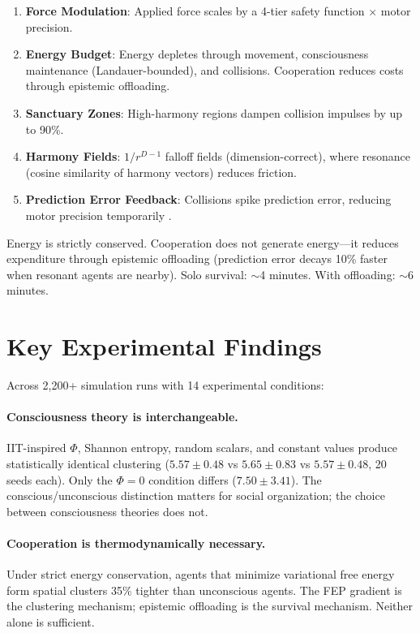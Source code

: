 \documentclass[12pt]{book}
\begin{document}
\begin{enumerate}[nosep]
  \item \textbf{Force Modulation}: Applied force scales by a 4-tier safety function $\times$ motor precision.
  \item \textbf{Energy Budget}: Energy depletes through movement, consciousness maintenance (Landauer-bounded), and collisions. Cooperation reduces costs through epistemic offloading.
  \item \textbf{Sanctuary Zones}: High-harmony regions dampen collision impulses by up to 90\%.
  \item \textbf{Harmony Fields}: $1/r^{D-1}$ falloff fields (dimension-correct), where resonance (cosine similarity of harmony vectors) reduces friction.
  \item \textbf{Prediction Error Feedback}: Collisions spike prediction error, reducing motor precision temporarily \citep{adams2013}.
\end{enumerate}

Energy is strictly conserved. Cooperation does not generate energy---it reduces expenditure through epistemic offloading (prediction error decays 10\% faster when resonant agents are nearby). Solo survival: $\sim$4 minutes. With offloading: $\sim$6 minutes.

\section{Key Experimental Findings}

Across 2,200+ simulation runs with 14 experimental conditions:

\paragraph{Consciousness theory is interchangeable.} IIT-inspired $\Phi$, Shannon entropy, random scalars, and constant values produce statistically identical clustering ($5.57 \pm 0.48$ vs $5.65 \pm 0.83$ vs $5.57 \pm 0.48$, 20 seeds each). Only the $\Phi = 0$ condition differs ($7.50 \pm 3.41$). The conscious/unconscious distinction matters for social organization; the choice between consciousness theories does not.

\paragraph{Cooperation is thermodynamically necessary.} Under strict energy conservation, agents that minimize variational free energy form spatial clusters 35\% tighter than unconscious agents. The FEP gradient is the clustering mechanism; epistemic offloading is the survival mechanism. Neither alone is sufficient.
\end{document}
